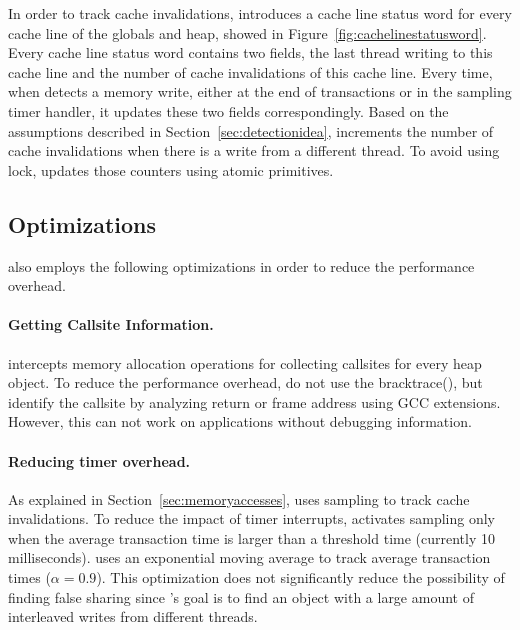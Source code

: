 In order to track cache invalidations, \SheriffDetect{} introduces a cache line status word for every cache line of the globals and heap, showed in Figure~\ref{fig:cachelinestatusword}.  Every cache line status word contains two fields, the last thread writing to this cache line and the number of cache invalidations of this cache line. 
Every time, when \SheriffDetect{} detects a memory write, either at the end of transactions or in the sampling timer handler,  it updates these two fields correspondingly. Based on the assumptions described in Section~\ref{sec:detectionidea}, \SheriffDetect{} increments the number of cache invalidations when there is a write from a different thread. To avoid using lock, \SheriffDetect{} updates those counters using atomic primitives. 

\subsection{Optimizations}

\SheriffDetect{} also employs the following optimizations in order to reduce the performance overhead. 

\paragraph{Getting Callsite Information.}
\SheriffDetect{} intercepts memory allocation operations for collecting callsites for every heap object. To reduce the performance overhead, \SheriffDetect{} do not use the bracktrace(), but identify the callsite by analyzing return or frame address using GCC extensions. However, this can not work on applications without debugging information. 

\paragraph{Reducing timer overhead.}
As explained in Section~\ref{sec:memoryaccesses}, \SheriffDetect{} uses sampling to track cache invalidations. To reduce the impact of timer interrupts, \SheriffDetect{} activates sampling only when the average transaction time is larger than a threshold time (currently 10 milliseconds). \SheriffDetect{} uses an exponential moving average to track average transaction times ($\alpha = 0.9$). This optimization does not significantly reduce the possibility of finding false sharing since \SheriffDetect{}'s goal  is to find an object with a large amount of interleaved writes from different threads.

